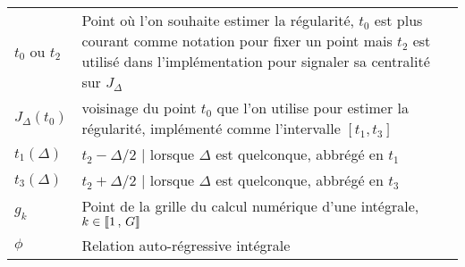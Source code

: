 \begin{table}[H]
\begin{tabularx}{\textwidth}{lX}
		$t_0$ ou $t_2$                                                                                  & Point où l'on souhaite estimer la régularité, $t_0$ est plus courant comme notation pour fixer un point mais $t_2$ est utilisé dans l'implémentation pour signaler sa centralité sur $J_\Delta$                                                                                                                                             \\
		$J_\Delta(t_0)$                                                                                 & \og voisinage \fg du point $t_0$ que l'on utilise pour estimer la régularité, implémenté comme l'intervalle $[t_1, t_3]$                                                                                                                                                                                                                    \\
		$t_1(\Delta)$                                                                                   & $t_2 - \Delta/2$ | lorsque $\Delta$ est quelconque, abbrégé en $t_1$                                                                                                                                                                                                                                                                        \\
		$t_3(\Delta)$                                                                                   & $t_2 + \Delta/2$ | lorsque $\Delta$ est quelconque, abbrégé en $t_3$                                                                                                                                                                                                                                                                        \\
		$g_k$                                                                                           & Point de la grille du calcul numérique d'une intégrale, $k \in \llbracket 1 \, , \, G \rrbracket$                                                                                                                                                                                                                                                           \\
		\midrule
		$\phi$                                                                                          & Relation auto-régressive intégrale                                                                                                                                                                                                                                                                                                          \\

\end{tabularx}
\end{table}
